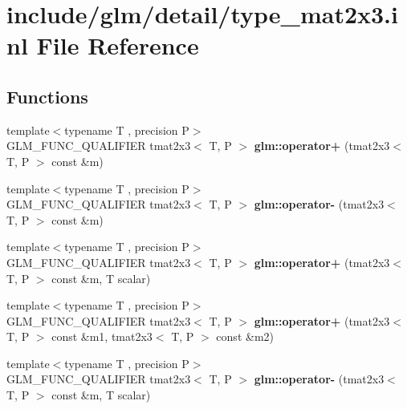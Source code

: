 \hypertarget{type__mat2x3_8inl}{}\section{include/glm/detail/type\+\_\+mat2x3.inl File Reference}
\label{type__mat2x3_8inl}
\subsection*{Functions}
\begin{DoxyCompactItemize}
\item 
\mbox{\label{type__mat2x3_8inl_adbd6031dd5be1df1ba21e09770d80baa}} 
{\footnotesize template$<$typename T , precision P$>$ }\\G\+L\+M\+\_\+\+F\+U\+N\+C\+\_\+\+Q\+U\+A\+L\+I\+F\+I\+ER tmat2x3$<$ T, P $>$ {\bfseries glm\+::operator+} (tmat2x3$<$ T, P $>$ const \&m)
\item 
\mbox{\label{type__mat2x3_8inl_ac0531b9437e7358ffddc22b5391ddcca}} 
{\footnotesize template$<$typename T , precision P$>$ }\\G\+L\+M\+\_\+\+F\+U\+N\+C\+\_\+\+Q\+U\+A\+L\+I\+F\+I\+ER tmat2x3$<$ T, P $>$ {\bfseries glm\+::operator-\/} (tmat2x3$<$ T, P $>$ const \&m)
\item 
\mbox{\label{type__mat2x3_8inl_a111f2541c2c682598588071f1afda6ec}} 
{\footnotesize template$<$typename T , precision P$>$ }\\G\+L\+M\+\_\+\+F\+U\+N\+C\+\_\+\+Q\+U\+A\+L\+I\+F\+I\+ER tmat2x3$<$ T, P $>$ {\bfseries glm\+::operator+} (tmat2x3$<$ T, P $>$ const \&m, T scalar)
\item 
\mbox{\label{type__mat2x3_8inl_a7578fa8147ab1357184c6043278f38e5}} 
{\footnotesize template$<$typename T , precision P$>$ }\\G\+L\+M\+\_\+\+F\+U\+N\+C\+\_\+\+Q\+U\+A\+L\+I\+F\+I\+ER tmat2x3$<$ T, P $>$ {\bfseries glm\+::operator+} (tmat2x3$<$ T, P $>$ const \&m1, tmat2x3$<$ T, P $>$ const \&m2)
\item 
\mbox{\label{type__mat2x3_8inl_a41c3d1ca0057b34f39b9cb74d3d50489}} 
{\footnotesize template$<$typename T , precision P$>$ }\\G\+L\+M\+\_\+\+F\+U\+N\+C\+\_\+\+Q\+U\+A\+L\+I\+F\+I\+ER tmat2x3$<$ T, P $>$ {\bfseries glm\+::operator-\/} (tmat2x3$<$ T, P $>$ const \&m, T scalar)

\end{DoxyCompactItemize}
